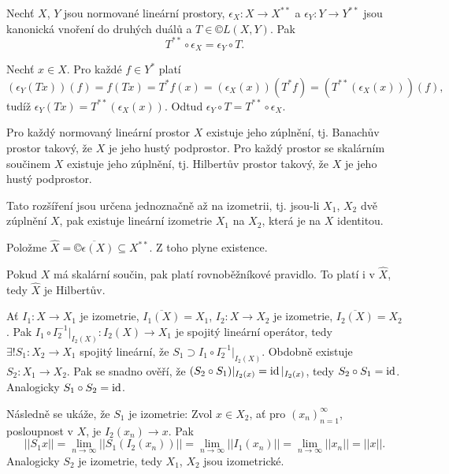 \documentclass[12pt]{article}					%
\begin{document}
\begin{tvrzeni}[J. P. Schauder, 1930]
	Nechť $X$, $Y$ jsou normované lineární prostory, $\epsilon_X: X \rightarrow X^{**}$ a $\epsilon_Y: Y \rightarrow Y^{**}$ jsou kanonická vnoření do druhých duálů a $T \in ©L(X, Y)$. Pak
	$$ T^{**} \circ \epsilon_X = \epsilon_Y \circ T. $$


	\begin{dukazin}[Ze skript]
		Nechť $x \in X$. Pro každé $f \in Y^*$ platí
		$$ (\epsilon_Y(Tx))(f) = f(Tx) = T^*f(x) = (\epsilon_X(x))(T^* f) = (T^{**}(\epsilon_X(x)))(f), $$
		tudíž $\epsilon_Y(Tx) = T^{**}(\epsilon_X(x))$. Odtud $\epsilon_Y \circ T = T^{**} \circ \epsilon_X$.
	\end{dukazin}
\end{tvrzeni}

\begin{veta}
	Pro každý normovaný lineární prostor $X$ existuje jeho zúplnění, tj. Banachův prostor takový, že $X$ je jeho hustý podprostor. Pro každý prostor se skalárním součinem $X$ existuje jeho zúplnění, tj. Hilbertův prostor takový, že $X$ je jeho hustý podprostor.

	Tato rozšíření jsou určena jednoznačně až na izometrii, tj. jsou-li $X_1$, $X_2$ dvě zúplnění $X$, pak existuje lineární izometrie $X_1$ na $X_2$, která je na $X$ identitou.

	\begin{dukazin}
		Položme $\hat{X} = \overline{©\epsilon(X)} \subseteq X^{**}$. Z toho plyne existence.

		Pokud $X$ má skalární součin, pak platí rovnoběžníkové pravidlo. To platí i v $\hat{X}$, tedy $\hat{X}$ je Hilbertův.

		Ať $I_1: X \rightarrow X_1$ je izometrie, $\overline{I_1(X)} = X_1$, $I_2: X \rightarrow X_2$ je izometrie, $\overline{I_2(X)} = X_2$. Pak $I_1 \circ I_2^{-1}|_{I_2(X)}: I_2(X) \rightarrow X_1$ je spojitý lineární operátor, tedy $\exists! S_1: X_2 \rightarrow X_1$ spojitý lineární, že $S_1 \supset I_1 \circ I_2^{-1}|_{I_2(X)}$. Obdobně existuje $S_2: X_1 \rightarrow X_2$. Pak se snadno ověří, že $(S_2 \circ S_1)|_{I_2(x)} = \operatorname{id}|_{I_2(x)}$, tedy $S_2 \circ S_1 = \operatorname{id}$. Analogicky $S_1 \circ S_2 = \operatorname{id}$.

		Následně se ukáže, že $S_1$ je izometrie: Zvol $x \in X_2$, ať pro $(x_n)_{n=1}^∞$, posloupnost v $X$, je $I_2(x_n) \rightarrow x$. Pak
		$$ ||S_1 x|| = \lim_{n \rightarrow ∞}||S_1(I_2(x_n))|| = \lim_{n \rightarrow ∞} ||I_1(x_n)|| = \lim_{n \rightarrow ∞}||x_n|| = ||x||. $$
		Analogicky $S_2$ je izometrie, tedy $X_1$, $X_2$ jsou izometrické.
	\end{dukazin}

\end{veta}
	
\end{document}
